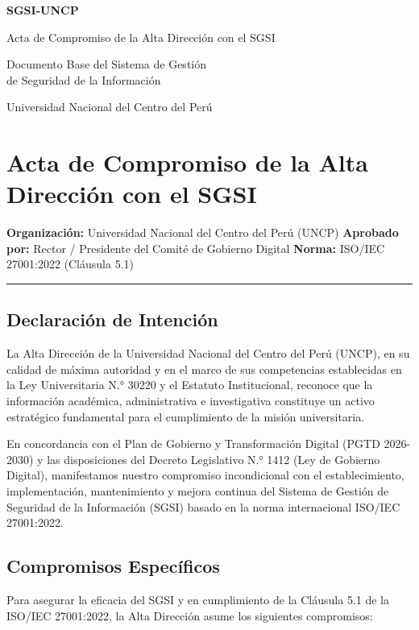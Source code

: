 \documentclass[10pt,letterpaper]{article}
\newcommand{\makecover}{
\begin{titlepage}
\centering
\vspace*{2cm}
{\Huge\bfseries\color{uncpblue} SGSI-UNCP\par}
\vspace{0.7cm}
{\LARGE Acta de Compromiso de la Alta Dirección con el SGSI\par}
\vspace{0.5cm}
{\large Documento Base del Sistema de Gestión\\de Seguridad de la Información\par}
\vspace{1.5cm}
{\small Universidad Nacional del Centro del Perú\par}
\vfill
\end{titlepage}
}
\begin{document}
\makecover
\setcounter{tocdepth}{2}
\RaggedRight
\tableofcontents
\newpage

\RaggedRight
\section{Acta de Compromiso de la Alta Dirección con el
SGSI}\label{acta-de-compromiso-de-la-alta-direcciuxf3n-con-el-sgsi}

\textbf{Organización:} Universidad Nacional del Centro del Perú (UNCP)
\textbf{Aprobado por:} Rector / Presidente del Comité de Gobierno
Digital \textbf{Norma:} ISO/IEC 27001:2022 (Cláusula 5.1)

\begin{center}\rule{0.5\linewidth}{0.5pt}\end{center}

\subsection{Declaración de
Intención}\label{declaraciuxf3n-de-intenciuxf3n}

La Alta Dirección de la Universidad Nacional del Centro del Perú (UNCP),
en su calidad de máxima autoridad y en el marco de sus competencias
establecidas en la Ley Universitaria N.° 30220 y el Estatuto
Institucional, reconoce que la información académica, administrativa e
investigativa constituye un activo estratégico fundamental para el
cumplimiento de la misión universitaria.

En concordancia con el Plan de Gobierno y Transformación Digital (PGTD
2026-2030) y las disposiciones del Decreto Legislativo N.° 1412 (Ley de
Gobierno Digital), manifestamos nuestro compromiso incondicional con el
establecimiento, implementación, mantenimiento y mejora continua del
Sistema de Gestión de Seguridad de la Información (SGSI) basado en la
norma internacional ISO/IEC 27001:2022.

\subsection{Compromisos Específicos}\label{compromisos-especuxedficos}

Para asegurar la eficacia del SGSI y en cumplimiento de la Cláusula 5.1
de la ISO/IEC 27001:2022, la Alta Dirección asume los siguientes
compromisos:
\end{document}
